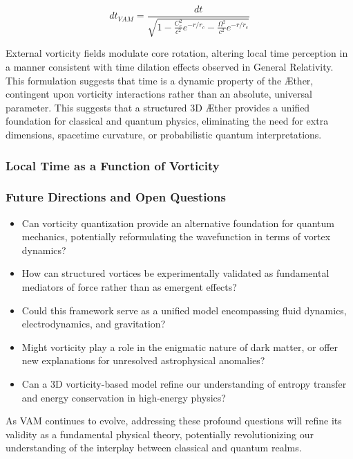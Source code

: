 \documentclass[a4paper,10pt]{article}
\begin{document}
\begin{equation*}
    dt_{VAM} = \frac{dt}{\sqrt{1 - \frac{C_e^2}{c^2} e^{-r/r_c} - \frac{\Omega^2}{c^2} e^{-r/r_c}}}
\end{equation*}

External vorticity fields modulate core rotation, altering local time perception in a manner consistent with time dilation effects observed in General Relativity.
This formulation suggests that time is a dynamic property of the Æther, contingent upon vorticity interactions rather than an absolute, universal parameter.
    This suggests that a structured 3D Æther provides a unified foundation for classical and quantum physics, eliminating the need for extra dimensions, spacetime curvature, or probabilistic quantum interpretations.

\subsubsection*{Local Time as a Function of Vorticity}\label{subsubsec:local-time-as-a-function-of-vorticity}



\subsubsection*{Future Directions and Open Questions}
\begin{itemize}
    \item Can vorticity quantization provide an alternative foundation for quantum mechanics, potentially reformulating the wavefunction in terms of vortex dynamics?
    \item How can structured vortices be experimentally validated as fundamental mediators of force rather than as emergent effects?
    \item Could this framework serve as a unified model encompassing fluid dynamics, electrodynamics, and gravitation?
    \item Might vorticity play a role in the enigmatic nature of dark matter, or offer new explanations for unresolved astrophysical anomalies?
    \item Can a 3D vorticity-based model refine our understanding of entropy transfer and energy conservation in high-energy physics?
\end{itemize}

As VAM continues to evolve, addressing these profound questions will refine its validity as a fundamental physical theory, potentially revolutionizing our understanding of the interplay between classical and quantum realms.
\end{document}
